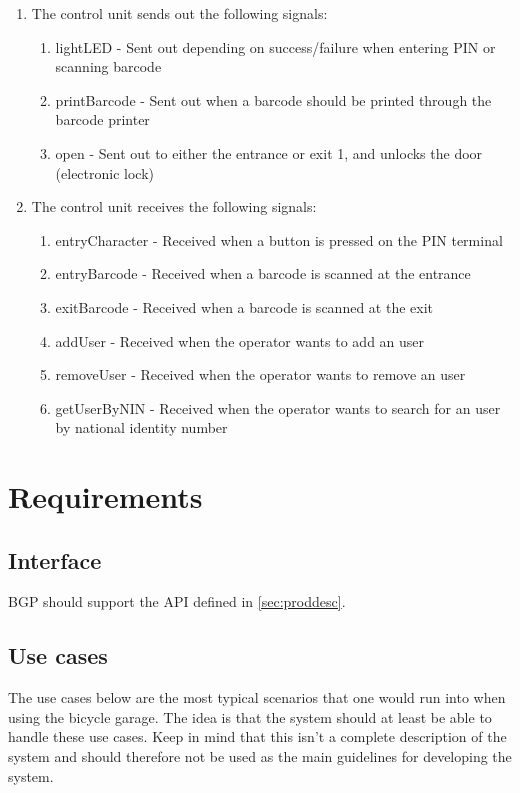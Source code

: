 \documentclass[12pt,titlepage,bibliography=totoc]{article}
\begin{document}
\begin{enumerate}
	\item The control unit sends out the following signals:
	\begin{enumerate}
		\item lightLED - Sent out depending on success/failure when entering PIN or scanning barcode
		\item printBarcode - Sent out when a barcode should be printed through the barcode printer
		\item open - Sent out to either the entrance or exit 1, and unlocks the door (electronic lock)
	\end{enumerate}
	\item The control unit receives the following signals:
	\begin{enumerate}
		\item entryCharacter - Received when a button is pressed on the PIN terminal
		\item entryBarcode - Received when a barcode is scanned at the entrance
		\item exitBarcode - Received when a barcode is scanned at the exit
		\item addUser - Received when the operator wants to add an user
		\item removeUser - Received when the operator wants to remove an user
		\item getUserByNIN - Received when the operator wants to search for an user by national identity number
	\end{enumerate}
\end{enumerate}

\section{Requirements}
\subsection{Interface}
BGP should support the API defined in \cref{sec:proddesc}.
\subsection{Use cases}
\label{sec:cases}
The use cases below are the most typical scenarios that one would run into when using the bicycle garage. The idea is that the system should at least be able to handle these use cases. Keep in mind that this isn't a complete description of the system and should therefore not be used as the main guidelines for developing the system.
\end{document}
